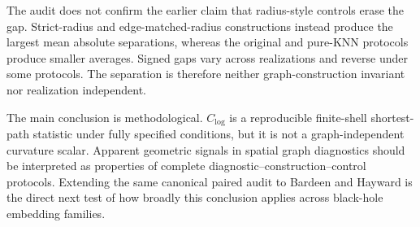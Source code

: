 \documentclass[11pt]{article}
\newcommand{\clog}{C_{\log}}
\begin{document}
The audit does not confirm the earlier claim that radius-style controls erase
the gap. Strict-radius and edge-matched-radius constructions instead produce the
largest mean absolute separations, whereas the original and pure-KNN protocols
produce smaller averages. Signed gaps vary across realizations and reverse under
some protocols. The separation is therefore neither graph-construction
invariant nor realization independent.

The main conclusion is methodological. $\clog$ is a reproducible finite-shell
shortest-path statistic under fully specified conditions, but it is not a
graph-independent curvature scalar. Apparent geometric signals in spatial graph
diagnostics should be interpreted as properties of complete
 diagnostic--construction--control protocols. Extending the same canonical
paired audit to Bardeen and Hayward is the direct next test of how broadly this
conclusion applies across black-hole embedding families.
\end{document}
